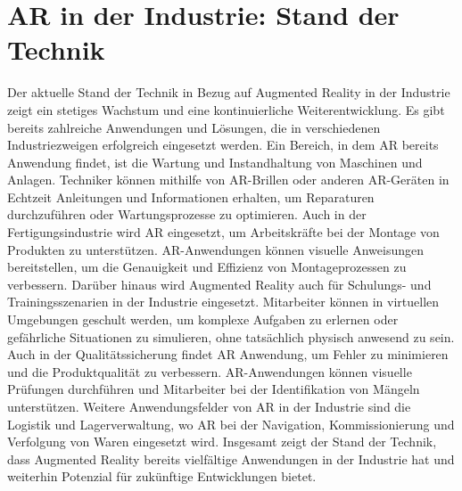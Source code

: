 \section{AR in der Industrie: Stand der Technik}

Der aktuelle Stand der Technik in Bezug auf Augmented Reality in der Industrie
zeigt ein stetiges Wachstum und eine kontinuierliche Weiterentwicklung. Es gibt
bereits zahlreiche Anwendungen und Lösungen, die in verschiedenen
Industriezweigen erfolgreich eingesetzt werden. Ein Bereich, in dem AR bereits
Anwendung findet, ist die Wartung und Instandhaltung von Maschinen und Anlagen.
Techniker können mithilfe von AR-Brillen oder anderen AR-Geräten in Echtzeit
Anleitungen und Informationen erhalten, um Reparaturen durchzuführen oder
Wartungsprozesse zu optimieren. Auch in der Fertigungsindustrie wird AR
eingesetzt, um Arbeitskräfte bei der Montage von Produkten zu unterstützen.
AR-Anwendungen können visuelle Anweisungen bereitstellen, um die Genauigkeit
und Effizienz von Montageprozessen zu verbessern. Darüber hinaus wird Augmented
Reality auch für Schulungs- und Trainingsszenarien in der Industrie eingesetzt.
Mitarbeiter können in virtuellen Umgebungen geschult werden, um komplexe
Aufgaben zu erlernen oder gefährliche Situationen zu simulieren, ohne
tatsächlich physisch anwesend zu sein. Auch in der Qualitätssicherung findet AR
Anwendung, um Fehler zu minimieren und die Produktqualität zu verbessern.
AR-Anwendungen können visuelle Prüfungen durchführen und Mitarbeiter bei der
Identifikation von Mängeln unterstützen. Weitere Anwendungsfelder von AR in der
Industrie sind die Logistik und Lagerverwaltung, wo AR bei der Navigation,
Kommissionierung und Verfolgung von Waren eingesetzt wird. Insgesamt zeigt der
Stand der Technik, dass Augmented Reality bereits vielfältige Anwendungen in
der Industrie hat und weiterhin Potenzial für zukünftige Entwicklungen bietet.